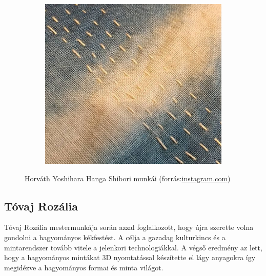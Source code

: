 \documentclass[fontsize=12pt, appendixprefix=true]{scrreprt}
\begin{document}
\begin{figure}[h!]
\begin{subfigure}[b]{0.3\linewidth}
	  \caption{}
	\end{subfigure}
	\begin{subfigure}[b]{0.3\linewidth}
		\includegraphics[width=\linewidth]{img/hh_3.png}
		\caption{}
	  \end{subfigure}
	\caption{Horváth Yoshihara Hanga Shibori munkái (forrás:\href{https://www.instagram.com/cicvarek1223}{instagram.com})}
	\label{fig:hyh}
  \end{figure}

\subsection{Tóvaj Rozália}
Tóvaj Rozália mestermunkája során azzal foglalkozott, hogy újra szerette volna gondolni a hagyományos kékfestést. A célja a gazadag kulturkincs és a mintarendszer tovább vitele a jelenkori technologiákkal. A végső eredmény az lett, hogy a hagyományos mintákat 3D nyomtatással készítette el lágy anyagokra így megidézve a hagyományos formai és minta világot.
\end{document}
